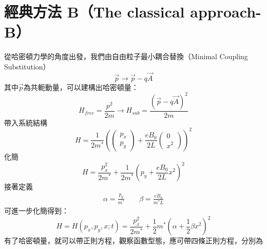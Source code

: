 \documentclass[12pt]{article}
\begin{document}
\section{經典方法 B（The classical approach-B）}
從哈密頓力學的角度出發，我們由自由粒子最小耦合替換（Minimal Coupling Substitution）\[\vec{p}\to\vec{p}-q\vec{A}\] 其中$\vec{p}$為共軛動量，可以建構出哈密頓量：
\begin{equation}
    H_{free}=\frac{p^2}{2m}\to H_{sub}=\frac{(\vec{p}-q\vec{A})^2}{2m}
\end{equation}
帶入系統結構
\begin{equation}
    H=\frac{1}{2m^*}\left(\begin{pmatrix}p_x\\p_y\end{pmatrix}+\frac{eB_0}{2L}\begin{pmatrix}0\\x^2\end{pmatrix}\right)^2
\end{equation}
化簡
\begin{equation}
    H=\frac{p_x^2}{2m^*}+\frac{1}{2m^*}\left(p_y+\frac{eB_0}{2L}x^2\right)^2
\end{equation}
接著定義
\begin{align*}
    \alpha=\frac{p_y}{m^*} \qquad \beta=\frac{eB_0}{m^*L}
\end{align*}
可進一步化簡得到：
\begin{equation}
    H=H(p_x,p_y,x;t)=\frac{p_x^2}{2m^*}+\frac{1}{2}m^*\left(\alpha+\frac12\beta x^2\right)^2\label{13}
\end{equation}
\newpage
\noindent
有了哈密頓量，就可以帶正則方程，觀察函數型態，應可帶四條正則方程，分別為
\end{document}
